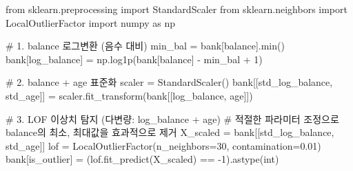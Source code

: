 \documentclass[
  a4paper,
  DIV=11,
  numbers=noendperiod]{scrreprt}
\newenvironment{Shaded}{\begin{snugshade}}{\end{snugshade}}
\newcommand{\BuiltInTok}[1]{\textcolor[rgb]{0.00,0.23,0.31}{#1}}
\newcommand{\CommentTok}[1]{\textcolor[rgb]{0.37,0.37,0.37}{#1}}
\newcommand{\DecValTok}[1]{\textcolor[rgb]{0.68,0.00,0.00}{#1}}
\newcommand{\FloatTok}[1]{\textcolor[rgb]{0.68,0.00,0.00}{#1}}
\newcommand{\ImportTok}[1]{\textcolor[rgb]{0.00,0.46,0.62}{#1}}
\newcommand{\NormalTok}[1]{\textcolor[rgb]{0.00,0.23,0.31}{#1}}
\newcommand{\OperatorTok}[1]{\textcolor[rgb]{0.37,0.37,0.37}{#1}}
\newcommand{\StringTok}[1]{\textcolor[rgb]{0.13,0.47,0.30}{#1}}
\begin{document}
\begin{Shaded}
\begin{Highlighting}[]
\ImportTok{from}\NormalTok{ sklearn.preprocessing }\ImportTok{import}\NormalTok{ StandardScaler}
\ImportTok{from}\NormalTok{ sklearn.neighbors }\ImportTok{import}\NormalTok{ LocalOutlierFactor}
\ImportTok{import}\NormalTok{ numpy }\ImportTok{as}\NormalTok{ np}

\CommentTok{\# 1. balance 로그변환 (음수 대비)}
\NormalTok{min\_bal }\OperatorTok{=}\NormalTok{ bank[}\StringTok{\textquotesingle{}balance\textquotesingle{}}\NormalTok{].}\BuiltInTok{min}\NormalTok{()}
\NormalTok{bank[}\StringTok{\textquotesingle{}log\_balance\textquotesingle{}}\NormalTok{] }\OperatorTok{=}\NormalTok{ np.log1p(bank[}\StringTok{\textquotesingle{}balance\textquotesingle{}}\NormalTok{] }\OperatorTok{{-}}\NormalTok{ min\_bal }\OperatorTok{+} \DecValTok{1}\NormalTok{)}

\CommentTok{\# 2. balance + age 표준화}
\NormalTok{scaler }\OperatorTok{=}\NormalTok{ StandardScaler()}
\NormalTok{bank[[}\StringTok{\textquotesingle{}std\_log\_balance\textquotesingle{}}\NormalTok{, }\StringTok{\textquotesingle{}std\_age\textquotesingle{}}\NormalTok{]] }\OperatorTok{=}\NormalTok{ scaler.fit\_transform(bank[[}\StringTok{\textquotesingle{}log\_balance\textquotesingle{}}\NormalTok{, }\StringTok{\textquotesingle{}age\textquotesingle{}}\NormalTok{]])}

\CommentTok{\# 3. LOF 이상치 탐지 (다변량: log\_balance + age)}
\CommentTok{\# 적절한 파라미터 조정으로 balance의 최소, 최대값을 효과적으로 제거}
\NormalTok{X\_scaled }\OperatorTok{=}\NormalTok{ bank[[}\StringTok{\textquotesingle{}std\_log\_balance\textquotesingle{}}\NormalTok{, }\StringTok{\textquotesingle{}std\_age\textquotesingle{}}\NormalTok{]]}
\NormalTok{lof }\OperatorTok{=}\NormalTok{ LocalOutlierFactor(n\_neighbors}\OperatorTok{=}\DecValTok{30}\NormalTok{, contamination}\OperatorTok{=}\FloatTok{0.01}\NormalTok{)}
\NormalTok{bank[}\StringTok{\textquotesingle{}is\_outlier\textquotesingle{}}\NormalTok{] }\OperatorTok{=}\NormalTok{ (lof.fit\_predict(X\_scaled) }\OperatorTok{==} \OperatorTok{{-}}\DecValTok{1}\NormalTok{).astype(}\BuiltInTok{int}\NormalTok{)}


\end{Highlighting}
\end{Shaded}
\end{document}
